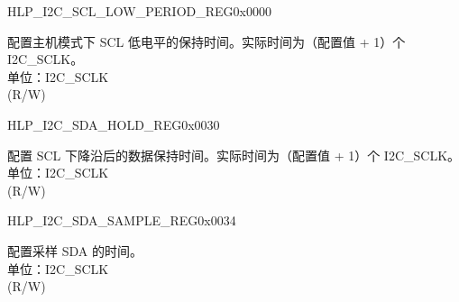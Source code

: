 \begin{register}{H}{LP\_I2C\_SCL\_LOW\_PERIOD\_REG}{0x0000}\label{regdesc:LPI2CSCLLOWPERIODREG}
%
%
\regnewline%
\begin{regdesc}\begin{reglist}
\label{fielddesc:LPI2CSCLLOWPERIOD}\item [LP\_I2C\_SCL\_LOW\_PERIOD] 配置主机模式下 SCL 低电平的保持时间。实际时间为（配置值 + 1）个 I2C\_SCLK。\\
单位：I2C\_SCLK \\ (R/W)
\end{reglist}\end{regdesc}
\end{register}


\begin{register}{H}{LP\_I2C\_SDA\_HOLD\_REG}{0x0030}\label{regdesc:LPI2CSDAHOLDREG}
%
%
\regnewline%
\begin{regdesc}\begin{reglist}
\label{fielddesc:LPI2CSDAHOLDTIME}\item [LP\_I2C\_SDA\_HOLD\_TIME] 配置 SCL 下降沿后的数据保持时间。实际时间为（配置值 + 1）个 I2C\_SCLK。\\
单位：I2C\_SCLK \\ (R/W)
\end{reglist}\end{regdesc}
\end{register}


\begin{register}{H}{LP\_I2C\_SDA\_SAMPLE\_REG}{0x0034}\label{regdesc:LPI2CSDASAMPLEREG}
%
%
\regnewline%
\begin{regdesc}\begin{reglist}
\label{fielddesc:LPI2CSDASAMPLETIME}\item [LP\_I2C\_SDA\_SAMPLE\_TIME] 配置采样 SDA 的时间。\\
单位：I2C\_SCLK \\ (R/W)
\end{reglist}\end{regdesc}
\end{register}


